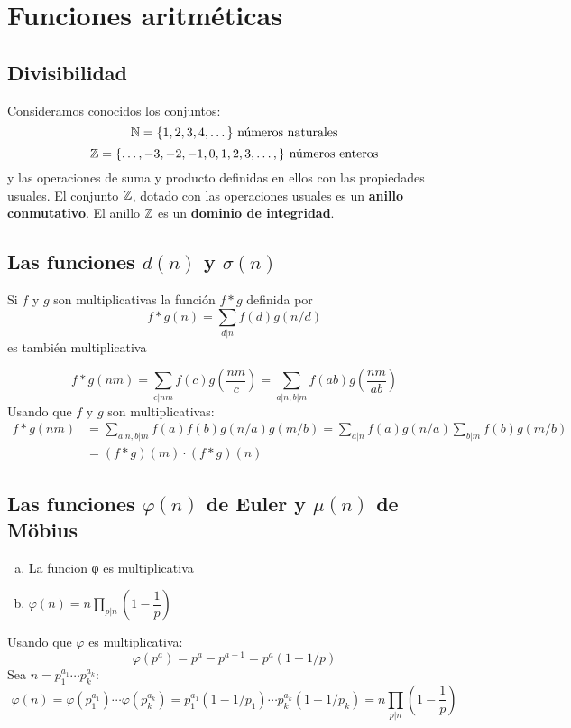 \documentclass[TAN.tex]{subfiles}
\begin{document}
\chapter{Funciones aritméticas}
\section{Divisibilidad}
Consideramos conocidos los conjuntos:
\[ \mathbb{N} = \{1,2,3,4,\dots\} \text{ números naturales}\]
\[ \mathbb{Z} = \{\dots,-3,-2,-1,0,1,2,3,\dots,\} \text{ números enteros}\]
y las operaciones de suma y producto definidas en ellos con las propiedades usuales. El conjunto $\mathbb{Z}$, dotado con las operaciones usuales es un \textbf{anillo conmutativo}. El anillo $\mathbb{Z}$ es un \textbf{dominio de integridad}.

\section{Las funciones $d(n)$ y $σ(n)$}

\begin{prop} Si $f$ y $g$ son multiplicativas la función $f * g$ definida por
\[ f * g (n) = \sum_{d|n} f(d)g(n/d) \]
es también multiplicativa

\begin{dem}
\[ f*g(nm) = \sum_{c|nm}f(c)g\left(\frac{nm}{c}\right) = \sum_{a|n,b|m}f(ab)g\left(\frac{nm}{ab}\right) \]
Usando que $f$ y $g$ son multiplicativas:
\begin{align*}
	f*g(nm) & = \sum_{a|n,b|m} f(a)f(b)g(n/a)g(m/b)  = \sum_{a|n}f(a)g(n/a) \sum_{b|m}f(b)g(m/b) \\
	& = (f*g)(m) \cdot (f*g)(n)
\end{align*}
\QED
\end{dem}
\end{prop}

\section{Las funciones $φ(n)$ de Euler y $μ(n)$ de Möbius}
\begin{prop}\mbox{}
\begin{enumerate}[(a)]
	\item La funcion φ es multiplicativa
	\item $φ(n) = n \displaystyle\prod_{p|n} \left(1-\dfrac{1}{p}\right)$
\end{enumerate}
\end{prop}

\begin{dem}
Usando que $φ$ es multiplicativa:
\[ φ(p^a) = p^a - p^{a-1} = p^a(1-1/p) \]
Sea $n = p_1^{a_1}\cdots p_k^{a_k}$:
\[ φ(n) = φ(p_1^{a_1})\cdots φ(p_k^{a_k}) = p_1^{a_1}(1-1/p_1)\cdots p_k^{a_k}(1-1/p_k) = n \prod_{p|n} \left(1-\dfrac{1}{p}\right)\]
\QED
\end{dem}
\end{document}
